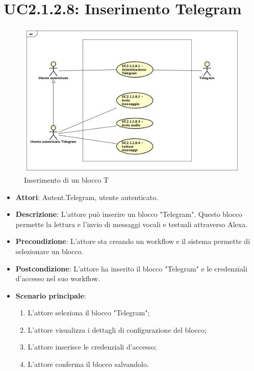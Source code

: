 \section{UC2.1.2.8: Inserimento Telegram}
\label{UC2.1.2.8}
\begin{figure} [h]
	\centering
	\includegraphics[scale=0.4]{./Diagram/Telegram.png}
	\caption{Inserimento di un blocco T}\label{}
\end{figure}
\begin{itemize}
	\item \textbf{Attori}: Autent.Telegram, utente autenticato.
	\item \textbf{Descrizione}: L'attore può inserire un blocco "Telegram". Questo blocco permette la lettura e l'invio di messaggi vocali e testuali attraverso Alexa.
	\item \textbf{Precondizione}: L'attore sta creando un workflow e il sistema permette di selezionare un blocco.
	\item \textbf{Postcondizione}: L'attore ha inserito il blocco "Telegram" e le credenziali d'accesso nel suo workflow.
	\item \textbf{Scenario principale}:
	\begin{enumerate} \item L'attore seleziona il blocco "Telegram"; \item L'attore visualizza i dettagli di configurazione del blocco; \item  L'attore inserisce le credenziali d'accesso; \item L'attore conferma il blocco salvandolo.\end{enumerate}
\end{itemize}

